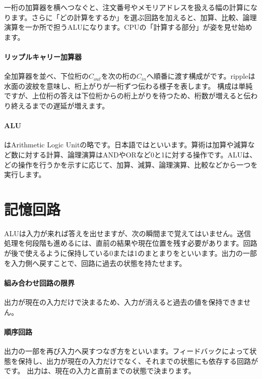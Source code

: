 一桁の加算器を横へつなぐと、注文番号やメモリアドレスを扱える幅の計算になります。さらに「どの計算をするか」を選ぶ回路を加えると、加算、比較、論理演算を一か所で担うALUになります。CPUの「計算する部分」が姿を見せ始めます。

\begingroup
  \centering
  \vspace{4mm}
\begingroup
\paragraph{リップルキャリー加算器}
        全加算器を並べ、下位桁の$C_{out}$を次の桁の$C_{in}$へ順番に渡す構成がです。rippleは水面の波紋を意味し、桁上がりが一桁ずつ伝わる様子を表します。
        構成は単純ですが、上位桁の答えは下位桁からの桁上がりを待つため、桁数が増えると伝わり終えるまでの遅延が増えます。

\par
\endgroup
\medskip
\begingroup
\paragraph{ALU}
        はArithmetic Logic Unitの略です。日本語ではといいます。算術は加算や減算など数に対する計算、論理演算はANDやORなど0と1に対する操作です。ALUは、どの操作を行うかを示すに応じて、加算、減算、論理演算、比較などから一つを実行します。

\par
\endgroup
\par
\endgroup


\section{記憶回路}
\label{sec:01-digital-computer-10}

ALUは入力が来れば答えを出せますが、次の瞬間まで覚えてはいません。送信処理を何段階も進めるには、直前の結果や現在位置を残す必要があります。回路が後で使えるように保持している0または1のまとまりをといいます。出力の一部を入力側へ戻すことで、回路に過去の状態を持たせます。

\begingroup
\begingroup
\paragraph{組み合わせ回路の限界}
        出力が現在の入力だけで決まるため、入力が消えると過去の値を保持できません。

\paragraph{順序回路}
        出力の一部を再び入力へ戻すつなぎ方をといいます。フィードバックによって状態を保持し、出力が現在の入力だけでなく、それまでの状態にも依存する回路がです。
        出力は、現在の入力と直前までの状態で決まります。

